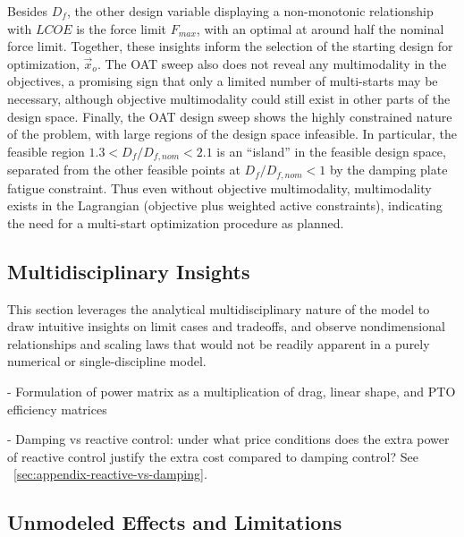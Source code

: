 Besides $D_f$, the other design variable displaying a non-monotonic relationship with $LCOE$ is the force limit $F_{max}$, with an optimal at around half the nominal force limit.
Together, these insights inform the selection of the starting design for optimization, $\vec{x}_o$.
The OAT sweep also does not reveal any multimodality in the objectives, a promising sign that only a limited number of multi-starts may be necessary, although objective multimodality could still exist in other parts of the design space.
Finally, the OAT design sweep shows the highly constrained nature of the problem, with large regions of the design space infeasible.
In particular, the feasible region $1.3<D_f/D_{f,nom}<2.1$ is an ``island'' in the feasible design space, separated from the other feasible points at $D_f/D_{f,nom}<1 $ by the damping plate fatigue constraint.
Thus even without objective multimodality, multimodality exists in the Lagrangian (objective plus weighted active constraints), indicating the need for a multi-start optimization procedure as planned.

\subsection{Multidisciplinary Insights}
This section leverages the analytical multidisciplinary nature of the model to draw intuitive insights on limit cases and tradeoffs, and observe nondimensional relationships and scaling laws that would not be readily apparent in a purely numerical or single-discipline model.

- Formulation of power matrix as a multiplication of drag, linear shape, and PTO efficiency matrices


- Damping vs reactive control: under what price conditions does the extra power of reactive control justify the extra cost compared to damping control?
See \appendixautorefname~\ref{sec:appendix-reactive-vs-damping}.



\subsection{Unmodeled Effects and Limitations}
